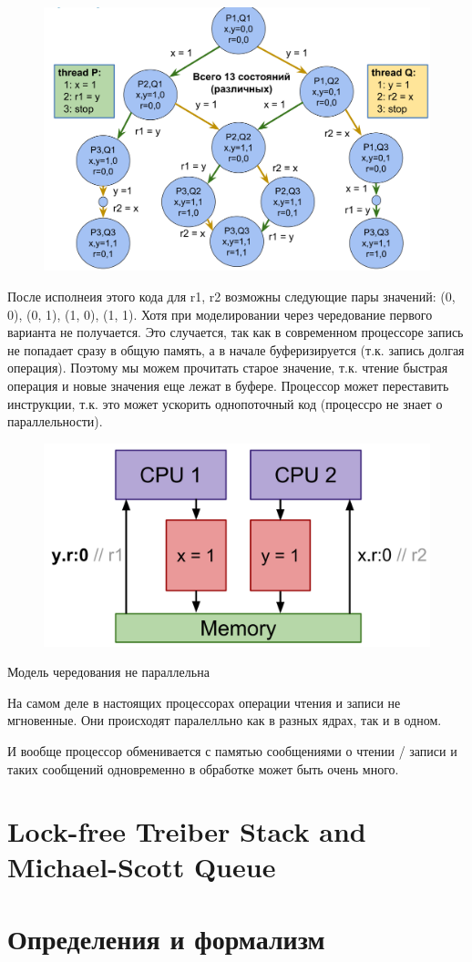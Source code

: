 \documentclass[10pt,a4paper,oneside,titlepage]{article}
\begin{document}
\begin{figure}[h!]
	\centering
	\includegraphics[width=0.5\linewidth]{pictures/Model1}
	\caption{}
	\label{fig:model1}
\end{figure}


После исполнеия этого кода для r1, r2 возможны следующие пары значений: (0, 0), (0, 1), (1, 0), (1, 1). Хотя при моделировании через чередование первого варианта не получается. Это случается, так как в современном процессоре запись не попадает сразу в общую память, а в начале буферизируется (т.к. запись долгая операция). Поэтому мы можем прочитать старое значение, т.к. чтение быстрая операция и новые значения еще лежат в буфере. Процессор может переставить инструкции, т.к. это может ускорить однопоточный код (процессро не знает о параллельности).

\begin{figure}[h!]
	\centering
	\includegraphics[width=0.4\linewidth]{pictures/Memory}
	\caption{}
	\label{fig:memory}
\end{figure}

Модель чередования не параллельна

На самом деле в настоящих процессорах операции чтения и записи не мгновенные. Они происходят паралелльно как в разных ядрах, так и в одном.

И вообще процессор обменивается с памятью сообщениями о чтении / записи и таких сообщений одновременно в обработке может быть очень много.

\section{Lock-free Treiber Stack and Michael-Scott Queue}

\section{Определения и формализм}
\end{document}
